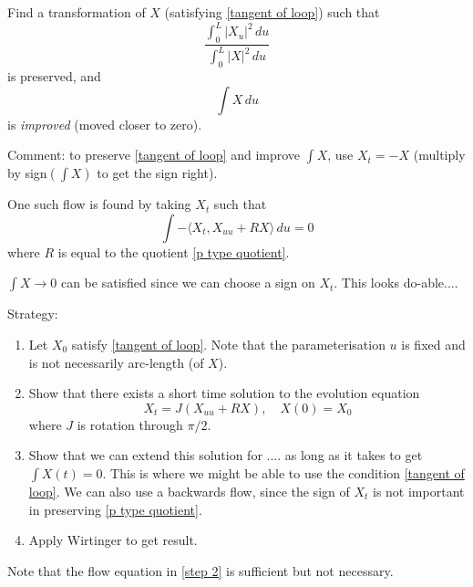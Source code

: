 \documentclass{amsart}
\begin{document}
  Find a transformation of $X$ (satisfying \eqref{tangent of loop}) such that 
  \begin{equation} \label{p type quotient} \frac{\int_0^L |X_u|^2 \,du }{\int_0^L |X|^2 \,du } \end{equation}
  is preserved, and 
  $$\int X \,du$$ is \emph{improved} (moved closer to zero).
   
 
  
  Comment:   to preserve \eqref{tangent of loop} and improve $\int X$, use $X_t=-X$ (multiply by sign$(\int X)$ to get the sign right).   
  
  One such flow is found by taking $X_t$ such that 
  \[ \int -\langle X_t, X_{uu} + RX\rangle \,du =0 \]
  where $R$ is equal to the quotient \eqref{p type quotient}.   
 
 $\int X \rightarrow 0$ can be satisfied since we can choose a sign on $X_t$.     This looks do-able....
 
 Strategy:

\begin{enumerate}
\item   Let $X_0$ satisfy \eqref{tangent of loop}.   Note that the parameterisation $u$ is fixed and is not necessarily arc-length (of $X$).       
\item Show that there exists a short time solution to the evolution equation \label{step 2}
$$X_t= J(X_{uu}+ RX), \quad X(0)=X_0$$
where $J$ is rotation through $\pi/2$. 
\item Show that we can extend this solution for .... as long as it takes to get $\int X(t)=0$.    This is where we might be able to use the condition \eqref{tangent of loop}.    We can also use a backwards flow, since the sign of $X_t$ is not important in preserving \eqref{p type quotient}.   


\item Apply Wirtinger to get result.
\end{enumerate}
 
 Note that the flow equation in \ref{step 2} is sufficient but not necessary.    
\end{document}
